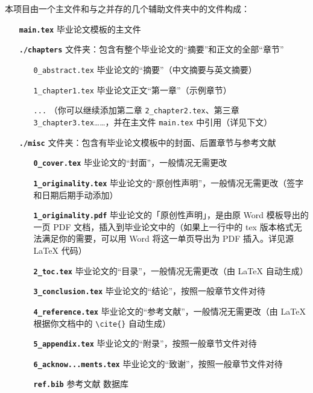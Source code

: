 本项目由一个主文件和与之并存的几个辅助文件夹中的文件构成：

\begin{itemize}
  \item[\color{RubineRed}\textbf{\texttt{main.tex}}] 毕业论文模板的主文件
  \item[\color{RubineRed}\textbf{\texttt{./chapters}}] 文件夹：包含有整个毕业论文的“摘要”和正文的全部“章节”
  \begin{itemize}
    \item[\color{RoyalBlue}\texttt{0\_abstract.tex}] 毕业论文的“摘要”（中文摘要与英文摘要）
    \item[\color{RoyalBlue}\texttt{1\_chapter1.tex}] 毕业论文正文“第一章”（示例章节）
    \item[\color{RoyalBlue}\texttt{...}] （你可以继续添加第二章 \texttt{2\_chapter2.tex}、第三章 \texttt{3\_chapter3.tex}……，并在主文件 \texttt{main.tex} 中引用（详见下文）
  \end{itemize}
  \item[\color{RubineRed}\textbf{\texttt{./misc}}] 文件夹：包含有毕业论文模板中的封面、后置章节与参考文献
  \begin{itemize}
    \item[\color{RoyalBlue}\textbf{\texttt{0\_cover.tex}}] 毕业论文的“封面”，一般情况无需更改
    \item[\color{RoyalBlue}\textbf{\texttt{1\_originality.tex}}] 毕业论文的“原创性声明”，一般情况无需更改（签字和日期后期手动添加）
    \item[\color{RoyalBlue}\textbf{\texttt{1\_originality.pdf}}] 毕业论文的「原创性声明」，是由原 Word 模板导出的一页 PDF 文档，插入到毕业论文中的（如果上一行中的 tex 版本格式无法满足你的需要，可以用 Word 将这一单页导出为 PDF 插入。详见源 LaTeX 代码）
    \item[\color{RoyalBlue}\textbf{\texttt{2\_toc.tex}}] 毕业论文的“目录”，一般情况无需更改（由 {\LaTeX} 自动生成）
    \item[\color{RoyalBlue}\textbf{\texttt{3\_conclusion.tex}}] 毕业论文的“结论”，按照一般章节文件对待
    \item[\color{RoyalBlue}\textbf{\texttt{4\_reference.tex}}] 毕业论文的“参考文献”，一般情况无需更改（由 {\LaTeX} 根据你文档中的 \verb|\cite{}| 自动生成）
    \item[\color{RoyalBlue}\textbf{\texttt{5\_appendix.tex}}] 毕业论文的“附录”，按照一般章节文件对待
    \item[\color{RoyalBlue}\textbf{\texttt{6\_acknow...ments.tex}}] 毕业论文的“致谢”，按照一般章节文件对待
    \item[\color{RoyalBlue}\textbf{\texttt{ref.bib}}] 参考文献  数据库
  \end{itemize}
\end{itemize}

